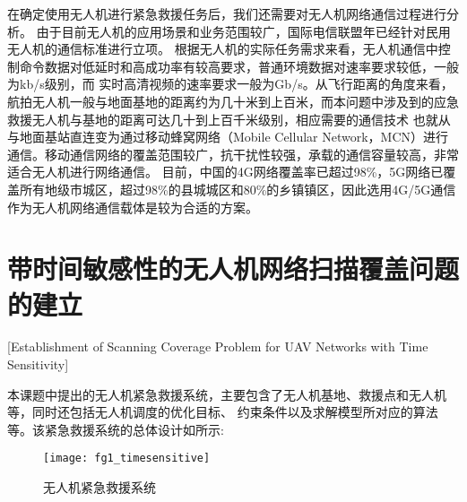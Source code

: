 在确定使用无人机进行紧急救援任务后，我们还需要对无人机网络通信过程进行分析。
由于目前无人机的应用场景和业务范围较广，国际电信联盟年已经针对民用无人机的通信标准进行立项\cite{hayat2016survey}。
根据无人机的实际任务需求来看，无人机通信中控制命令数据对低延时和高成功率有较高要求，普通环境数据对速率要求较低，一般为kb/s级别，而
实时高清视频的速率要求一般为Gb/s。从飞行距离的角度来看，航拍无人机一般与地面基地的距离约为几十米到上百米，而本问题中涉及到的应急救援无人机与基地的距离可达几十到上百千米级别，相应需要的通信技术
也就从与地面基站直连变为通过移动蜂窝网络（Mobile Cellular Network，MCN）进行通信。移动通信网络的覆盖范围较广，抗干扰性较强，承载的通信容量较高，非常适合无人机进行网络通信\cite{xumin2017}。
目前，中国的4G网络覆盖率已超过98\%，5G网络已覆盖所有地级市城区，超过98\%的县城城区和80\%的乡镇镇区，因此选用4G/5G通信作为无人机网络通信载体是较为合适的方案。

\section{带时间敏感性的无人机网络扫描覆盖问题的建立}[Establishment of Scanning Coverage Problem for UAV Networks with Time Sensitivity]

本课题中提出的无人机紧急救援系统，主要包含了无人机基地、救援点和无人机等，同时还包括无人机调度的优化目标、
约束条件以及求解模型所对应的算法等。该紧急救援系统的总体设计如所示:

\begin{figure}[ht]
	\centering
	\texttt{[image: fg1\_timesensitive]}
	\caption{无人机紧急救援系统}
	\label{fg201}
\end{figure}

